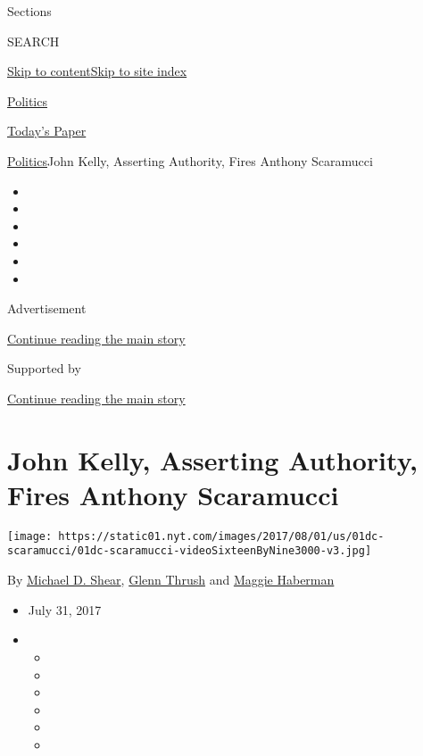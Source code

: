 Sections

SEARCH

\protect\hyperlink{site-content}{Skip to
content}\protect\hyperlink{site-index}{Skip to site index}

\href{https://www.nytimes.com/section/politics}{Politics}

\href{https://myaccount.nytimes.com/auth/login?response_type=cookie\&client_id=vi}{}

\href{https://www.nytimes.com/section/todayspaper}{Today's Paper}

\href{/section/politics}{Politics}\textbar{}John Kelly, Asserting
Authority, Fires Anthony Scaramucci

\begin{itemize}
\item
\item
\item
\item
\item
\item
\end{itemize}

Advertisement

\protect\hyperlink{after-top}{Continue reading the main story}

Supported by

\protect\hyperlink{after-sponsor}{Continue reading the main story}

\hypertarget{john-kelly-asserting-authority-fires-anthony-scaramucci}{%
\section{John Kelly, Asserting Authority, Fires Anthony
Scaramucci}\label{john-kelly-asserting-authority-fires-anthony-scaramucci}}

\texttt{[image: https://static01.nyt.com/images/2017/08/01/us/01dc-scaramucci/01dc-scaramucci-videoSixteenByNine3000-v3.jpg]}

By \href{http://www.nytimes.com/by/michael-d-shear}{Michael D. Shear},
\href{https://www.nytimes.com/by/glenn-thrush}{Glenn Thrush} and
\href{http://www.nytimes.com/by/maggie-haberman}{Maggie Haberman}

\begin{itemize}
\item
  July 31, 2017
\item
  \begin{itemize}
  \item
  \item
  \item
  \item
  \item
  \item
  \end{itemize}
\end{itemize}

